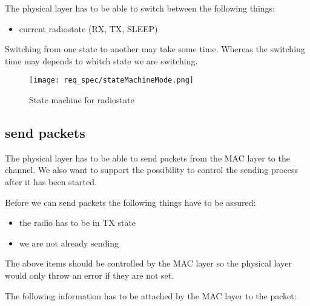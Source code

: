 The physical layer has to be able to switch between the following things:

\begin{itemize}
 \item current radiostate (RX, TX, SLEEP)
\end{itemize}

Switching from one state to another may take some time. Whereas the switching time may depends to whitch state we are switching.

\begin{figure}[H]
 \centering
 \texttt{[image: req\_spec/stateMachineMode.png]}
 \caption{State machine for radiostate}
 \label{fig: mode state machine}
\end{figure}


\subsection{send packets}
\label{subSendPackets}

The physical layer has to be able to send packets from the MAC layer to the channel. 
We also want to support the possibility to control
the sending process after it has been started.

Before we can send packets the following things have to be 
assured:
\begin{itemize}
 \item the radio has to be in TX state
 \item we are not already sending
\end{itemize}

The above items should be controlled by the MAC layer so the physical layer would only throw an error if they are not set.

The following information has to be attached by the MAC layer to the packet:

